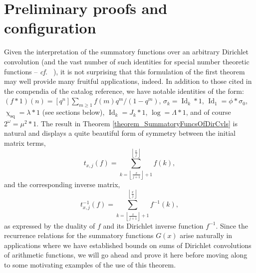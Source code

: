 \documentclass[11pt,reqno,a4letter]{article}
\numberwithin{figure}{section}
\numberwithin{table}{section}
\newcommand{\cf}{\textit{cf.\ }}
\newcommand{\floor}[1]{\left\lfloor #1 \right\rfloor}
\renewcommand{\chi}{\upchi}
\theoremstyle{plain}
\numberwithin{theorem}{section}
\theoremstyle{definition}
\begin{document}
\newpage 
\section{Preliminary proofs and configuration} 

Given the interpretation of the summatory functions over an arbitrary Dirichlet convolution 
(and the vast number of such identities for special number theoretic functions -- \cf 
\cite{CATALOG-INTDIRSERIES,CATALOG-LAMBERTSERIES}), it is not surprising that this formulation of the first theorem 
may well provide many fruitful applications, indeed. In addition to those cited in the 
compendia of the catalog reference, we have notable identities of the form: 
$(f \ast 1)(n) = [q^n] \sum_{m \geq 1} f(m) q^m / (1-q^m)$, 
$\sigma_k = \operatorname{Id}_k \ast 1$, $\operatorname{Id}_1 = \phi \ast \sigma_0$, 
$\chi_{\operatorname{sq}} = \lambda \ast 1$ (see sections below), 
$\operatorname{Id}_k = J_k \ast 1$, $\log = \Lambda \ast 1$, and of course 
$2^{\omega} = \mu^2 \ast 1$. 
The result in Theorem \ref{theorem_SummatoryFuncsOfDirCvls} is 
natural and displays a quite beautiful form of symmetry between the 
initial matrix terms, $$t_{x,j}(f) = \sum_{k=\floor{\frac{x}{j+1}}+1}^{\floor{\frac{x}{j}}} f(k),$$ and the 
corresponding inverse matrix, $$t_{x,j}^{-1}(f) = \sum_{k=\floor{\frac{x}{j+1}}+1}^{\floor{\frac{x}{j}}} f^{-1}(k),$$ 
as expressed by the duality of $f$ and its Dirichlet inverse function $f^{-1}$. Since the recurrence relations for the 
summatory functions $G(x)$ arise naturally in applications where we have established bounds on sums of 
Dirichlet convolutions of arithmetic functions, we will go ahead and prove it here before moving along to some 
motivating examples of the use of this theorem. 
\end{document}
